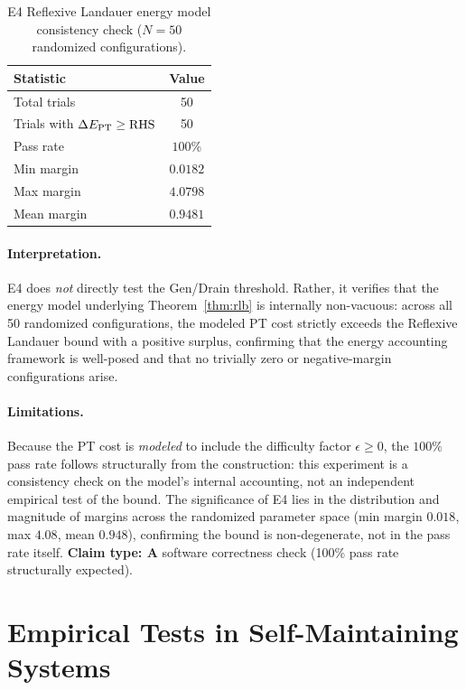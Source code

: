 \documentclass[11pt,twocolumn]{article}
\newcommand{\CatA}{\textbf{A}}
\theoremstyle{remark}
\begin{document}
\begin{table}[ht]
\centering
\caption{E4 Reflexive Landauer energy model consistency check ($N=50$ randomized configurations).}
\label{tab:e4}
\begin{tabular}{@{}lc@{}}
\toprule
Statistic & Value \\
\midrule
Total trials & 50 \\
Trials with $\Delta E_{\rm PT} \geq \mathrm{RHS}$ & 50 \\
Pass rate & $100\%$ \\
Min margin & $0.0182$ \\
Max margin & $4.0798$ \\
Mean margin & $0.9481$ \\
\bottomrule
\end{tabular}
\end{table}

\paragraph{Interpretation.}
E4 does \emph{not} directly test the Gen/Drain threshold.
Rather, it verifies that the energy model underlying
Theorem~\ref{thm:rlb} is internally non-vacuous: across all 50
randomized configurations, the modeled PT cost strictly exceeds
the Reflexive Landauer bound with a positive surplus, confirming
that the energy accounting framework is well-posed and that no
trivially zero or negative-margin configurations arise.

\paragraph{Limitations.}
Because the PT cost is \emph{modeled} to include the difficulty
factor $\epsilon \geq 0$, the $100\%$ pass rate follows structurally
from the construction: this experiment is a consistency check on
the model's internal accounting, not an independent empirical
test of the bound. The significance of E4 lies in the distribution
and magnitude of margins across the randomized parameter space
(min margin $0.018$, max $4.08$, mean $0.948$), confirming
the bound is non-degenerate, not in the pass rate itself.
\textbf{Claim type: $\CatA$} software correctness check (100\% pass rate structurally expected).

\section{Empirical Tests in Self-Maintaining Systems}
\label{sec:realworld}
\end{document}
